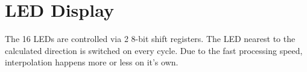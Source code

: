\section{LED Display}
\label{sec::display}

The 16 LEDs are controlled via 2 8-bit shift registers.
The LED nearest to the calculated direction is switched on every cycle.
Due to the fast processing speed, interpolation happens more or less on it's own.